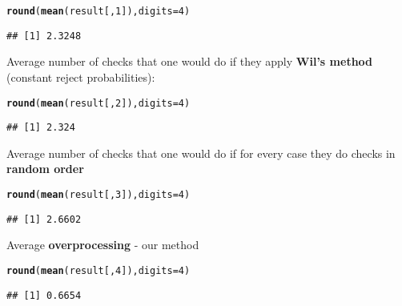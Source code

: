 \documentclass{article}\usepackage[]{graphicx}\usepackage[]{color}
\makeatletter
\newcommand{\hlnum}[1]{\textcolor[rgb]{0.686,0.059,0.569}{#1}}%
\newcommand{\hlstd}[1]{\textcolor[rgb]{0.345,0.345,0.345}{#1}}%
\newcommand{\hlkwc}[1]{\textcolor[rgb]{0.333,0.667,0.333}{#1}}%
\newcommand{\hlkwd}[1]{\textcolor[rgb]{0.737,0.353,0.396}{\textbf{#1}}}%
\newenvironment{kframe}{%
 \def\at@end@of@kframe{}%
 \ifinner\ifhmode%
  \def\at@end@of@kframe{\end{minipage}}%
  \begin{minipage}{\columnwidth}%
 \fi\fi%
 \def\FrameCommand##1{\hskip\@totalleftmargin \hskip-\fboxsep
 \colorbox{shadecolor}{##1}\hskip-\fboxsep
     \hskip-\linewidth \hskip-\@totalleftmargin \hskip\columnwidth}%
 \MakeFramed {\advance\hsize-\width
   \@totalleftmargin\z@ \linewidth\hsize
   \@setminipage}}%
 {\par\unskip\endMakeFramed%
 \at@end@of@kframe}
\newenvironment{knitrout}{}{} %
\makeatother
\begin{document}
\begin{knitrout}
\color{fgcolor}\begin{kframe}
\begin{alltt}
\hlkwd{round}\hlstd{(}\hlkwd{mean}\hlstd{(result[,}\hlnum{1}\hlstd{]),}\hlkwc{digits} \hlstd{=} \hlnum{4}\hlstd{)}
\end{alltt}
\begin{verbatim}
## [1] 2.3248
\end{verbatim}
\end{kframe}
\end{knitrout}

Average number of checks that one would do if they apply \textbf{Wil's method} (constant reject probabilities):

\begin{knitrout}
\color{fgcolor}\begin{kframe}
\begin{alltt}
\hlkwd{round}\hlstd{(}\hlkwd{mean}\hlstd{(result[,}\hlnum{2}\hlstd{]),}\hlkwc{digits} \hlstd{=} \hlnum{4}\hlstd{)}
\end{alltt}
\begin{verbatim}
## [1] 2.324
\end{verbatim}
\end{kframe}
\end{knitrout}

Average number of checks that one would do if for every case they do checks in \textbf{random order}

\begin{knitrout}
\color{fgcolor}\begin{kframe}
\begin{alltt}
\hlkwd{round}\hlstd{(}\hlkwd{mean}\hlstd{(result[,}\hlnum{3}\hlstd{]),}\hlkwc{digits} \hlstd{=} \hlnum{4}\hlstd{)}
\end{alltt}
\begin{verbatim}
## [1] 2.6602
\end{verbatim}
\end{kframe}
\end{knitrout}

Average \textbf{overprocessing} - our method

\begin{knitrout}
\color{fgcolor}\begin{kframe}
\begin{alltt}
\hlkwd{round}\hlstd{(}\hlkwd{mean}\hlstd{(result[,}\hlnum{4}\hlstd{]),}\hlkwc{digits} \hlstd{=} \hlnum{4}\hlstd{)}
\end{alltt}
\begin{verbatim}
## [1] 0.6654
\end{verbatim}
\end{kframe}
\end{knitrout}
\end{document}
